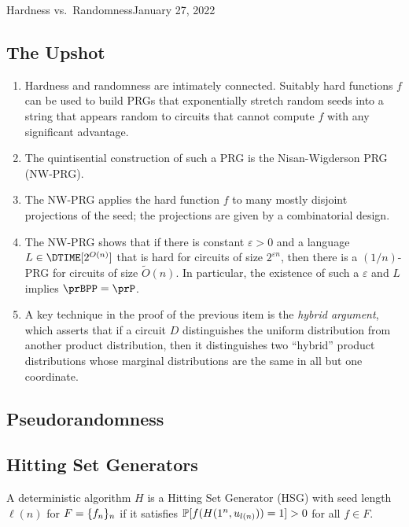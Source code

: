 \begin{lecture}{2}{Hardness vs.\ Randomness}{January 27, 2022}
\label{lec:02}

\subsection*{The Upshot}

\begin{enumerate}
  \item Hardness and randomness are intimately connected. Suitably hard
    functions $f$ can be used to build PRGs that exponentially stretch random
    seeds into a string that appears random to circuits that cannot compute $f$
    with any significant advantage.
  \item The quintisential construction of such a PRG is the Nisan-Wigderson PRG
    (NW-PRG).
  \item The NW-PRG applies the hard function $f$ to many mostly disjoint
    projections of the seed; the projections are given by a combinatorial
    design.
  \item The NW-PRG shows that if there is constant $\varepsilon > 0$ and a
    language $L \in \DTIME[2^{O(n)}]$ that is hard for circuits of size
    $2^{\varepsilon n}$, then there is a $(1/n)$-PRG for circuits of size
    $\widetilde{O}(n)$. In particular, the existence of such a $\varepsilon$ and
    $L$ implies $\prBPP = \prP$.
  \item A key technique in the proof of the previous item is the \emph{hybrid
    argument}, which asserts that if a circuit $D$ distinguishes the uniform
    distribution from another product distribution, then it distinguishes two
    ``hybrid'' product distributions whose marginal distributions are the same
    in all but one coordinate.
\end{enumerate}

\subsection{Pseudorandomness}

\subsection{Hitting Set Generators}

\begin{definition}
    A deterministic algorithm $H$ is a Hitting Set Generator (HSG) with seed length 
    $\ell(n)$ for $F = \{f_n\}_n$ if it satisfies $\mathbb{P}[f(H(1^n, u_{l(n)})) = 
    1] > 0$ for all $f \in F$.
\end{definition}


\end{lecture}
